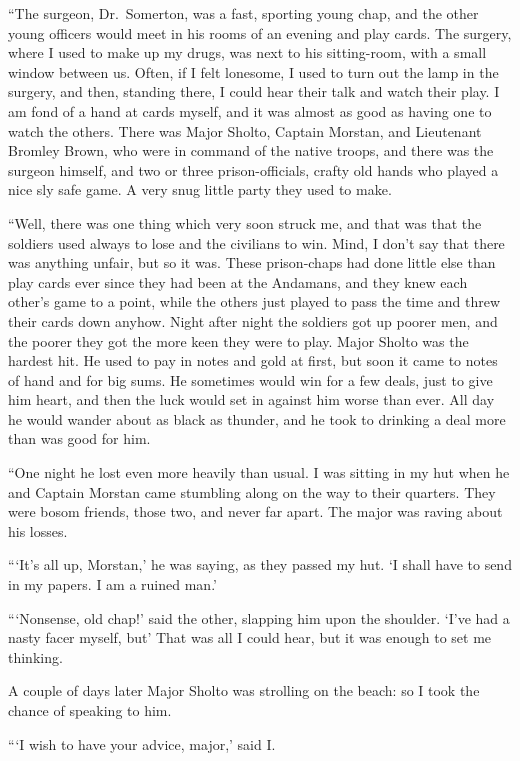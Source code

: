 \documentclass[12pt,english,oneside]{book}
\begin{document}
{}``The surgeon, Dr.\ Somerton, was a fast, sporting young chap,
and the other young officers would meet in his rooms of an evening
and play cards. The surgery, where I used to make up my drugs, was
next to his sitting-room, with a small window between us. Often, if
I felt lonesome, I used to turn out the lamp in the surgery, and then,
standing there, I could hear their talk and watch their play. I am
fond of a hand at cards myself, and it was almost as good as having
one to watch the others. There was Major Sholto, Captain Morstan,
and Lieutenant Bromley Brown, who were in command of the native troops,
and there was the surgeon himself, and two or three prison-officials,
crafty old hands who played a nice sly safe game. A very snug little
party they used to make.

{}``Well, there was one thing which very soon struck me, and that
was that the soldiers used always to lose and the civilians to win.
Mind, I don't say that there was anything unfair, but so it was. These
prison-chaps had done little else than play cards ever since they
had been at the Andamans, and they knew each other's game to a point,
while the others just played to pass the time and threw their cards
down anyhow. Night after night the soldiers got up poorer men, and
the poorer they got the more keen they were to play. Major Sholto
was the hardest hit. He used to pay in notes and gold at first, but
soon it came to notes of hand and for big sums. He sometimes would
win for a few deals, just to give him heart, and then the luck would
set in against him worse than ever. All day he would wander about
as black as thunder, and he took to drinking a deal more than was
good for him.

{}``One night he lost even more heavily than usual. I was sitting
in my hut when he and Captain Morstan came stumbling along on the
way to their quarters. They were bosom friends, those two, and never
far apart. The major was raving about his losses.

{}```It's all up, Morstan,' he was saying, as they passed my hut.
`I shall have to send in my papers. I am a ruined man.'

{}```Nonsense, old chap!' said the other, slapping him upon the shoulder.
`I've had a nasty facer myself, but\mdsh{---}' That was all I could
hear, but it was enough to set me thinking.

A couple of days later Major Sholto was strolling on the beach: so
I took the chance of speaking to him.

{}```I wish to have your advice, major,' said I.
\end{document}
